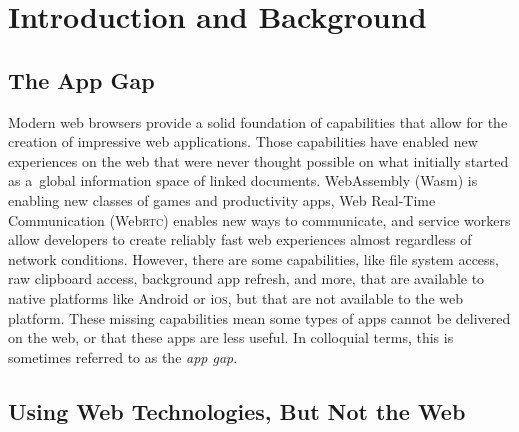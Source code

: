 \documentclass[sigconf, anonymous]{acmart}
\begin{document}


\maketitle

\section{Introduction and Background}

\subsection{The App Gap}

Modern web browsers provide a solid foundation of capabilities
that allow for the creation of impressive web applications.
Those capabilities have enabled new experiences on the web
that were never thought possible on what initially started as
a~global information space of linked documents.
WebAssembly (Wasm) is enabling new classes of games and productivity apps,
Web Real-Time Communication (Web\textsc{rtc}) enables new ways to communicate,
and service workers allow developers to create reliably fast web experiences
almost regardless of network conditions.
However, there are some capabilities, like file system access,
raw clipboard access, background app refresh, and more,
that are available to native platforms like Android or i\textsc{os},
but that are not available to the web platform.
These missing capabilities mean some types of apps cannot be delivered on the web,
or that these apps are less useful.
In colloquial terms, this is sometimes referred to as the \textit{app gap}.

\subsection{Using Web Technologies, But Not the Web}
\end{document}
